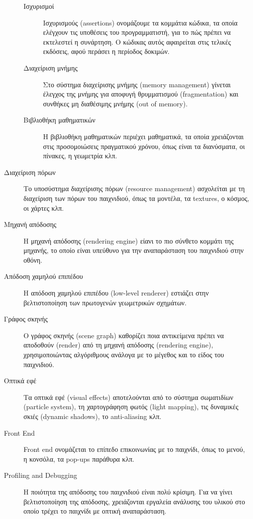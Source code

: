 \begin{description}
	\begin{description}
	\item [Ισχυρισμοί]	Ισχυρισμούς (assertions) ονομάζουμε τα κομμάτια κώδικα, τα οποία ελέγχουν τις υποθέσεις του προγραμματιστή, για το πώς πρέπει να εκτελεστεί η συνάρτηση. Ο κώδικας αυτός αφαιρείται στις τελικές εκδόσεις, αφού περάσει η περίοδος δοκιμών.
	
	\item [Διαχείριση μνήμης]Στο σύστημα διαχείρισης μνήμης (memory management) γίνεται έλεγχος της μνήμης για αποφυγή θρυμματισμού (fragmentation) και συνθήκες μη διαθέσιμης μνήμης (out of memory).
	
	\item [Βιβλιοθήκη μαθηματικών]Η βιβλιοθήκη μαθηματικών περιέχει μαθηματικά, τα οποία χρειάζονται στις προσομοιώσεις πραγματικού χρόνου, όπως είναι τα διανύσματα, οι πίνακες, η γεωμετρία κλπ.
	\end{description}

\item [Διαχείριση πόρων]Το υποσύστημα διαχείρισης πόρων (resource management) ασχολείται με τη διαχείριση των πόρων του παιχνιδιού, όπως τα μοντέλα, τα textures, ο κόσμος, οι χάρτες κλπ.

\item [Μηχανή απόδοσης] Η μηχανή απόδοσης (rendering engine) είανι το πιο σύνθετο κομμάτι της μηχανής, το οποίο είναι υπεύθυνο για την αναπαράσταση του παιχνιδιού στην οθόνη.
 
\item [Απόδοση χαμηλού επιπέδου]Η απόδοση χαμηλού επιπέδου (low-level renderer) εστιάζει στην βελτιστοποίηση των πρωτογενών γεωμετρικών σχημάτων.

\item [Γράφος σκηνής]Ο γράφος σκηνής (scene graph) καθορίζει ποια αντικείμενα πρέπει να αποδοθούν (render) από τη μηχανή απόδοσης (rendering engine), χρησιμοποιώντας αλγόριθμους ανάλογα με το μέγεθος και το είδος του παιχνιδιού.

\item [Οπτικά εφέ] Τα οπτικά εφέ (visual effects) αποτελούνται από το σύστημα σωματιδίων (particle system), τη χαρτογράφηση φωτός (light mapping), τις δυναμικές σκιές (dynamic shadows), το anti-aliasing κλπ.
 
\item [Front End]Front end ονομάζεται το επίπεδο επικοινωνίας με το παιχνίδι, όπως το μενού, η κονσόλα, τα pop-ups παράθυρα κλπ.

\item [Profiling and Debugging]Η ποιότητα της απόδοσης του παιχνιδιού είναι πολύ κρίσιμη. Για να γίνει βελτιστοποίηση της απόδοσης, χρειάζονται εργαλεία ανάλυσης του υλικού στο οποίο τρέχει το παιχνίδι με οπτική αναπαράσταση.


\end{description}
